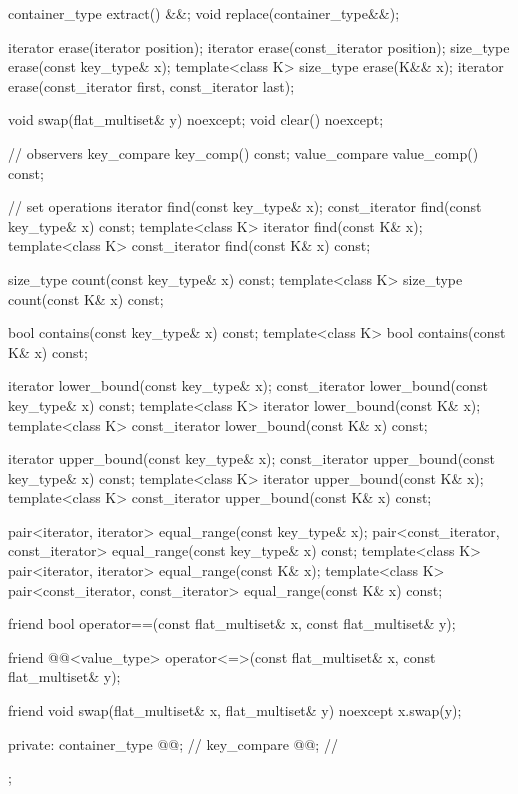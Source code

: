 \begin{codeblock}
{{    container_type extract() &&;
    void replace(container_type&&);

    iterator erase(iterator position);
    iterator erase(const_iterator position);
    size_type erase(const key_type& x);
    template<class K> size_type erase(K&& x);
    iterator erase(const_iterator first, const_iterator last);

    void swap(flat_multiset& y) noexcept;
    void clear() noexcept;

    // observers
    key_compare key_comp() const;
    value_compare value_comp() const;

    // set operations
    iterator find(const key_type& x);
    const_iterator find(const key_type& x) const;
    template<class K> iterator find(const K& x);
    template<class K> const_iterator find(const K& x) const;

    size_type count(const key_type& x) const;
    template<class K> size_type count(const K& x) const;

    bool contains(const key_type& x) const;
    template<class K> bool contains(const K& x) const;

    iterator lower_bound(const key_type& x);
    const_iterator lower_bound(const key_type& x) const;
    template<class K> iterator lower_bound(const K& x);
    template<class K> const_iterator lower_bound(const K& x) const;

    iterator upper_bound(const key_type& x);
    const_iterator upper_bound(const key_type& x) const;
    template<class K> iterator upper_bound(const K& x);
    template<class K> const_iterator upper_bound(const K& x) const;

    pair<iterator, iterator> equal_range(const key_type& x);
    pair<const_iterator, const_iterator> equal_range(const key_type& x) const;
    template<class K>
      pair<iterator, iterator> equal_range(const K& x);
    template<class K>
      pair<const_iterator, const_iterator> equal_range(const K& x) const;

    friend bool operator==(const flat_multiset& x, const flat_multiset& y);

    friend @@<value_type>
      operator<=>(const flat_multiset& x, const flat_multiset& y);

    friend void swap(flat_multiset& x, flat_multiset& y) noexcept
      { x.swap(y); }

  private:
    container_type @@;       // \expos
    key_compare @@;    // \expos
  };

}
\end{codeblock}
